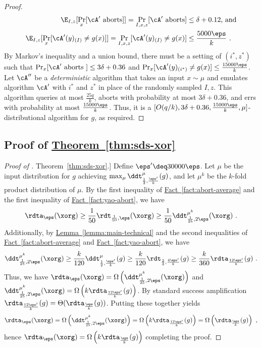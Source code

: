 \documentclass[11pt]{article}
\numberwithin{equation}{section}
\theoremstyle{definition}
\theoremstyle{plain}
\newcommand{\expref}[2]{\hyperref[#2]{#1~\ref{#2}}}
\begin{document}
\begin{proof}
%
%
%
\begin{align*}
  \E_{I,z}[\Pr_x[\cA' \text{ aborts}]] = \Pr_{I,x,z}[\cA' \text{ aborts}] &\leq \delta + 0.12 \text{, and}\\
  \E_{I,z}[\Pr_x[\cA'(y)_{(I)} \neq g(x)]] = \Pr_{I,x,z}[\cA'(y)_{(I)} \neq g(x)] &\leq \frac{5000\eps}{k}\ .
\end{align*}
By Markov's inequality and a union bound, there must be a setting of
$(i^*,z^*)$ such that
$\Pr_x[\cA' \text{ aborts }] \leq 3\delta + 0.36$ and
$\Pr_x[\cA'(y)_{(i^*)} \neq g(x)] \leq \frac{15000\eps}{k}$.  Let
$\cA''$ be a \emph{deterministic} algorithm that takes an input
$x \sim \mu$ and emulates algorithm $\cA'$ with $i^*$ and $z^*$ in
place of the randomly sampled $I,z$. This algorithm queries at most
$\frac{25q}{k}$, aborts with probability at most $3 \delta + 0.36$,
and errs with probability at most $\frac{15000\eps}{k}$.  Thus, it is
a $[O(q/k), 3\delta+0.36, \frac{15000\eps}{k}, \mu]$-distributional
algorithm for $g$, as required.
\end{proof}

    
\subsection{Proof of \expref{Theorem}{thm:sds-xor}}
\begin{proof}[Proof of \expref{Theorem}{thm:sds-xor}.]
  Define $\eps' \deq 30000\eps$.  Let $\mu$ be the input distribution
  for $g$ achieving
  $\max_\mu \ddt_{\frac{1}{2}, \frac{\eps'}{k}}^\mu(g)$, and let $\mu^k$
  be the $k$-fold product distribution of $\mu$.
  By the first inequality of \expref{Fact}{fact:abort-average} and the
  first inequality of \expref{Fact}{fact:yao-abort}, we
  have
  $$\rdta_\eps(\xorg) \geq \frac{1}{50}\rdt_{\frac{1}{50},\eps}(\xorg) \geq \frac{1}{50}\ddt_{\frac{1}{25}, 2\eps}^{\mu^k}(\xorg)\ .$$
  Additionally, by \expref{Lemma}{lemma:main-technical} and the second
  inequalities of \expref{Fact}{fact:abort-average}
  and \expref{Fact}{fact:yao-abort}, we have
  $$\ddt_{\frac{1}{25}, 2\eps}^{\mu^k}(\xorg) \geq \frac{k}{120} \ddt_{\frac{1}{2},\frac{\eps'}{k}}^\mu(g) \geq \frac{k}{120}\rdt_{\frac{2}{3},\frac{4\eps'}{k}}(g) \geq \frac{k}{360}\rdta_{\frac{12\eps'}{k}}(g) \ .$$
  Thus, we have
  $\rdta_\eps(\xorg) =
  \Omega\left(\ddt_{\frac{1}{25},2\eps}^{\mu^k}(\xorg)\right)$ and
  $\ddt_{\frac{1}{25},2\eps}^{\mu^k}(\xorg) =
  \Omega\left(k\rdta_{\frac{12\eps'}{k}}(g)\right)$.  By standard
  success amplification
  $\rdta_{\frac{12\eps'}{k}}(g) = \Theta(\rdta_{\frac{\eps}{k}}(g))$.
  Putting these together yields
  $$\rdta_\eps(\xorg) =
  \Omega\left(\ddt_{\frac{1}{25},2\eps}^{\mu^k}(\xorg)\right) =
  \Omega\left(k\rdta_{\frac{12\eps'}{k}}(g)\right) =
  \Omega\left(\rdta_{\frac{\eps}{k}}(g)\right)\ ,$$ hence
  $\rdta_\eps(\xorg) = \Omega\left(k\rdta_{\frac{\eps}{k}}(g)\right)$ completing the proof.
\end{proof}
\end{document}
